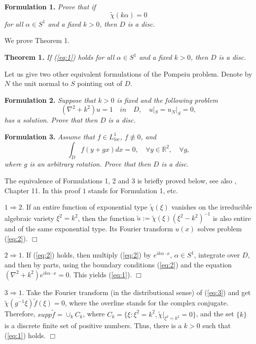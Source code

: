 \documentclass[final,11pt]{article}
\def\R{\mathbb{R}}
\begin{document}
{\bf Formulation 1.} {\it Prove that if
\begin{equation}\label{eq:1}
\tilde{\chi}(k\alpha)=0
\end{equation}
for all $\alpha\in S^1$ and a fixed $k>0$,
 then $D$ is a disc.}

We prove Theorem 1.

{\bf Theorem 1.}
{\it If (\ref{eq:1}) holds
for all $\alpha\in S^1$ and a fixed $k>0$,
then $D$ is a disc.}

Let us give two other equivalent formulations of the Pompeiu problem.
Denote by $N$ the unit normal to $S$ pointing out of $D$.

{\bf Formulation 2.} {\it Suppose that $k>0$ is fixed and the following problem
\begin{equation}\label{eq:2}
(\nabla^2+k^2)u=1 \quad in \quad D, \quad u|_S=u_N|_S=0,
\end{equation}
has a solution. Prove that then $D$ is a disc.}

{\bf Formulation 3.} {\it Assume that $f\in L^1_{loc}$, $f\not\equiv 0$, and
\begin{equation}\label{eq:3}
\int_Df(y+gx)dx=0, \quad \forall y\in \R^2, \quad \forall g,
\end{equation}
where $g$ is an arbitrary rotation. Prove that then $D$ is a
disc.}

The equivalence of Formulations 1, 2 and 3 is briefly proved below,
 see also \cite{R470}, Chapter 11. In this
proof $1$ stands for Formulation 1, etc.

$1\Rightarrow 2.$ If an entire function of exponential type
$\tilde{\chi}(\xi)$ vanishes on the irreducible algebraic variety
$\xi^2=k^2$, then the function
$\tilde{u}:=\tilde{\chi}(\xi)(\xi^2-k^2)^{-1}$ is also entire and of the
same exponential type. Its Fourier transform $u(x)$ solves problem
(\ref{eq:2}). \hfill $\Box$

$2\Rightarrow 1.$ If (\ref{eq:2}) holds, then multiply (\ref{eq:2})
by $e^{ik\alpha \cdot x}$, $\alpha\in S^1$, integrate over $D$, and
then by parts, using the boundary conditions (\ref{eq:2}) and the equation
$(\nabla^2+k^2)e^{ik\alpha \cdot x}=0$. This yields (\ref{eq:1}). \hfill $\Box$

$3\Rightarrow 1.$ Take the Fourier transform (in the distributional
sense) of (\ref{eq:3}) and get
$\overline{\tilde{\chi}(g^{-1}\xi)}\tilde{f}(\xi)=0$, where the overline
stands for the complex conjugate. Therefore,
$supp \tilde{f}=\cup_{k}C_k$, where $C_k=\{\xi: \xi^2=k^2,
\tilde{\chi}|_{\xi^2=k^2}=0\}$, and the set $\{k\}$ is a discrete finite
set
of positive numbers. Thus, there is a $k>0$ such that (\ref{eq:1}) holds. \hfill $\Box$
\end{document}
